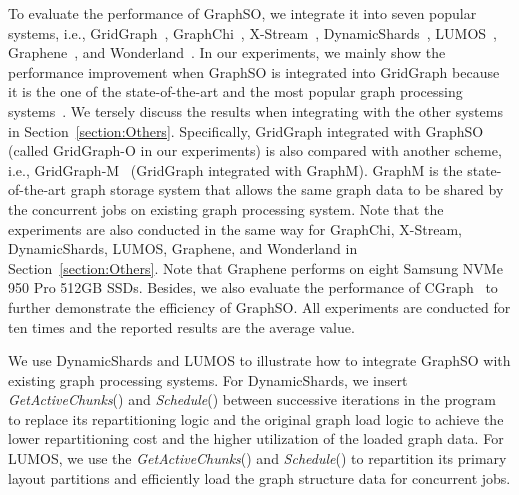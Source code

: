 \documentclass[10pt,journal,compsoc]{IEEEtran}
\begin{document}
To evaluate the performance of GraphSO, we integrate it into seven popular systems, i.e., GridGraph~\cite{GridGraph}, GraphChi~\cite{GraphChi}, X-Stream~\cite{X-stream}, DynamicShards~\cite{Vora}, LUMOS~\cite{LUMOS}, Graphene~\cite{Graphene}, and Wonderland~\cite{Wonderland}. In our experiments, we mainly show the performance improvement when GraphSO is integrated into GridGraph because it is the one of the state-of-the-art and the most popular graph processing systems~\cite{LUMOS, Wonderland}. We tersely discuss the results when integrating with the other systems in Section~\ref{section:Others}.
Specifically, GridGraph integrated with GraphSO (called GridGraph-O in our experiments) is also compared with another scheme, i.e., GridGraph-M~\cite{GraphM} (GridGraph integrated with GraphM). GraphM is the state-of-the-art graph storage system that allows the same graph data to be shared by the concurrent jobs on existing graph processing system.
Note that the experiments are also conducted in the same way for GraphChi, X-Stream, DynamicShards, LUMOS, Graphene, and Wonderland in Section~\ref{section:Others}. Note that Graphene performs on eight Samsung NVMe 950 Pro 512GB SSDs. Besides, we also evaluate the performance of CGraph~\cite{CGraph} to further demonstrate the efficiency of GraphSO.
All experiments are conducted for ten times and the reported results are the average value.


We use DynamicShards and LUMOS to illustrate how to integrate GraphSO with existing graph processing systems.
For DynamicShards, we insert \textit{GetActiveChunks}() and \textit{Schedule}() between successive iterations in the program to replace its repartitioning logic and the original graph load logic to achieve the lower repartitioning cost and the higher utilization of the loaded graph data. For LUMOS, we use the \textit{GetActiveChunks}() and \textit{Schedule}() to repartition its primary layout partitions and efficiently load the graph structure data for concurrent jobs.




\vspace{-8pt}
\end{document}
